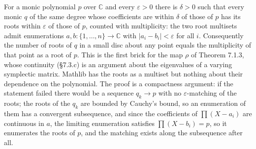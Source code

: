 \begin{lemma}
  \label{lem:roots-continuity}
  \leanok
  For a monic polynomial $p$ over $\mathbb{C}$ and every $\varepsilon > 0$ there
  is $\delta > 0$ such that every monic $q$ of the same degree whose coefficients
  are within $\delta$ of those of $p$ has its roots within $\varepsilon$ of those
  of $p$, counted with multiplicity: the two root multisets admit enumerations
  $a, b \colon \{1,\dots,n\} \to \mathbb{C}$ with $\lvert a_i - b_i\rvert <
  \varepsilon$ for all $i$.  Consequently the number of roots of $q$ in a small
  disc about any point equals the multiplicity of that point as a root of $p$.
  This is the first brick for the map $\rho$ of Theorem 7.1.3, whose continuity
  (\S7.3.c) is an argument about the eigenvalues of a varying symplectic
  matrix.  Mathlib has the roots as a multiset but nothing about their
  dependence on the polynomial.  The proof is a compactness argument: if the
  statement failed there would be a sequence $q_k \to p$ with no
  $\varepsilon$-matching of the roots; the roots of the $q_k$ are bounded by
  Cauchy's bound, so an enumeration of them has a convergent subsequence, and
  since the coefficients of $\prod (X - a_i)$ are continuous in $a$, the limiting
  enumeration satisfies $\prod (X - b_i) = p$, so it enumerates the roots of $p$,
  and the matching exists along the subsequence after all.
\end{lemma}

